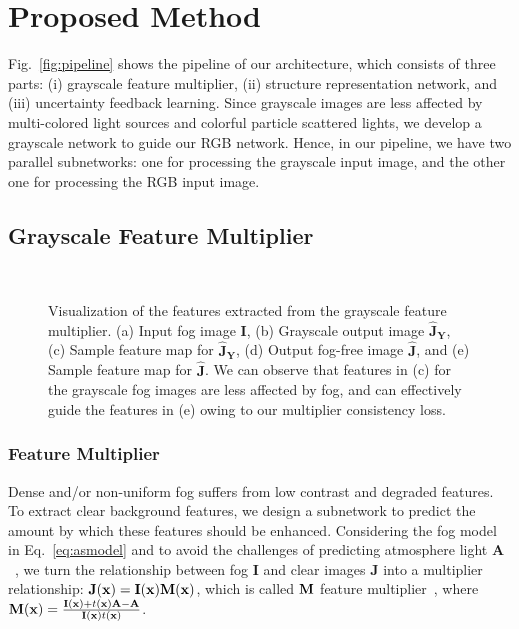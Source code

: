 \documentclass[runningheads]{llncs}
\newcommand{\bfx}{{\bf x}}
\newcommand{\bfI}{{\bf I}}
\newcommand{\bfJ}{{\bf J}}
\newcommand{\bfA}{{\bf A}}
\begin{document}
\section{Proposed Method}\label{sec:proposed}
Fig.~\ref{fig:pipeline} shows the pipeline of our architecture, which consists of three parts: (i) grayscale feature multiplier, (ii)  structure representation network, and (iii) uncertainty feedback learning.
Since grayscale images are less affected by multi-colored light sources and colorful particle scattered lights, we develop a grayscale network to guide our RGB network.
Hence, in our pipeline, we have two parallel subnetworks: one for processing the grayscale input image,  and the other one for processing the RGB input image.

\subsection{Grayscale Feature Multiplier}
\begin{figure}[t]
	\centering
	\hfill
	\hfill
	\hfill
	\hfill
	\hfill\\
	\caption{Visualization of the features extracted from the grayscale feature multiplier.
		(a) Input fog image $\mathbf{I}$, 
		(b) Grayscale output image $\mathbf{\hat{J}_Y}$,
		(c) Sample feature map for $\mathbf{\hat{J}_Y}$, 
		(d) Output fog-free image  $\mathbf{\hat{J}}$, 
		and (e) Sample feature map for  $\mathbf{\hat{J}}$. 
		We can observe that features in (c) for the grayscale fog images are less affected by fog, and can effectively guide the features in (e) owing to our multiplier consistency loss.}
	\label{fig:featureloss}
\end{figure}


\subsubsection{Feature Multiplier}
Dense and/or non-uniform fog suffers from low contrast and degraded features. 
To extract clear background features, we design a subnetwork to predict the amount by which these features should be enhanced.
Considering the fog model in Eq.~\eqref{eq:asmodel} and to avoid the challenges of predicting atmosphere light $\mathbf{A}$~\cite{Sulami2014}, 
we turn the relationship between fog $\mathbf{I}$ and clear images $\mathbf{J}$ into a multiplier relationship:
$\bfJ(\bfx) = \bfI(\bfx) \bf{M}(\bfx)$, which is called $\bf{M}$ feature multiplier~\cite{li2019rainflow}, where 
$\mathbf{M}(\bfx) =  \frac{\bfI(\bfx)+t(\bfx)\bfA-\bfA}{\bfI(\bfx)t(\bfx)}$.
\end{document}
